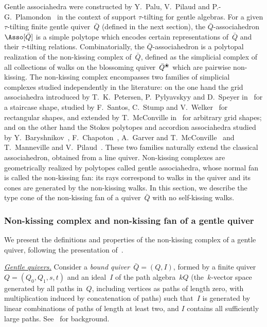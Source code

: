 \documentclass{amsart}
\theoremstyle{definition}
\newcommand{\darkblue}{\color{darkblue}} %
\newcommand{\defn}[1]{\textsl{\darkblue #1}} %
\newcommand{\para}[1]{\medskip\noindent\uline{\textit{#1.}}} %
\newcommand{\quiver}{\bar Q} %
\newcommand{\blossom}{^\text{\ding{96}}} %
\begin{document}
Gentle associahedra were constructed by Y.~Palu, V.~Pilaud and P.-G.~Plamondon~\cite{PaluPilaudPlamondon-nonkissing} in the context of support $\tau$-tilting for gentle algebras.
For a given $\tau$-tilting finite gentle quiver~$\quiver$ (defined in the next section), the $\quiver$-associahedron~$\Asso[\quiver]$ is a simple polytope which encodes certain representations of~$\quiver$ and their $\tau$-tilting relations.
Combinatorially, the $\quiver$-associahedron is a polytopal realization of the non-kissing complex of~$\quiver$, defined as the simplicial complex of all collections of walks on the blossoming quiver~$\quiver\blossom$ which are pairwise non-kissing.
The non-kissing complex encompasses two families of simplicial complexes studied independently in the literature: on the one hand the grid associahedra introduced by T.~K.~Petersen, P.~Pylyavskyy and D.~Speyer in~\cite{PetersenPylyavskyySpeyer} for a staircase shape, studied by F.~Santos, C.~Stump and V.~Welker~\cite{SantosStumpWelker} for rectangular shapes, and extended by T.~McConville in~\cite{McConville} for arbitrary grid shapes; and on the other hand the Stokes polytopes and accordion associahedra studied by Y.~Baryshnikov~\cite{Baryshnikov}, F.~Chapoton~\cite{Chapoton-quadrangulations}, A.~Garver and T.~McConville~\cite{GarverMcConville} and T.~Manneville and V.~Pilaud~\cite{MannevillePilaud-accordion}.
These two families naturally extend the classical associahedron, obtained from a line quiver.
Non-kissing complexes are geometrically realized by polytopes called gentle associahedra, whose normal fan is called the non-kissing fan: its rays correspond to walks in the quiver and its cones are generated by the non-kissing walks.
In this section, we describe the type cone of the non-kissing fan of a quiver~$\quiver$ with no self-kissing walks.

\subsubsection{Non-kissing complex and non-kissing fan of a gentle quiver}
\label{subsubsec:nonkissingComplex}

We present the definitions and properties of the non-kissing complex of a gentle quiver, following the presentation of~\cite{PaluPilaudPlamondon-nonkissing}.

\para{Gentle quivers}
%
Consider a \defn{bound quiver}~${\quiver = (Q,I)}$, formed by a finite quiver~$Q = (Q_0, Q_1, s, t)$ and an ideal~$I$ of the path algebra~$kQ$ (the~$k$-vector space generated by all paths in~$Q$, including vertices as paths of length zero, with multiplication induced by concatenation of paths) such that~$I$ is generated by linear combinations of paths of length at least two, and $I$ contains all sufficiently large paths. See~\cite{AssemSimsonSkowronski} for background.
\end{document}
